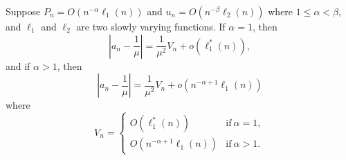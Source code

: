 \begin{theorem}
    Suppose $P_n = O(n^{-\alpha}\ell_1(n))$ and $u_n = O(n^{-\beta}\ell_2(n))$ where $1 \leq \alpha < \beta$, and $\ell_1$ and $\ell_2$ are two slowly varying functions.
    If $\alpha = 1$, then
    \[
        \left|a_n - \frac{1}{\mu}\right| = \frac{1}{\mu^2}V_n + o\left(\ell_1^*(n)\right),
    \]
    and if $\alpha > 1$, then
    \[
        \left|a_n - \frac{1}{\mu}\right| = \frac{1}{\mu^2}V_n + o(n^{-\alpha+1}\ell_1(n))
    \]
    where
    \[
        V_n = \begin{cases}
            O\left(\ell^*_1(n)\right)
                & \text{if}\ \alpha = 1,\\
            O\left(n^{-\alpha + 1} \ell_1(n)\right)
                & \text{if}\ \alpha > 1.
        \end{cases}
    \]
\end{theorem}
